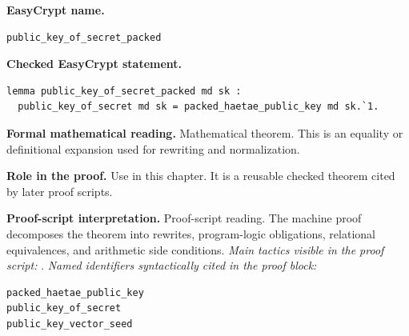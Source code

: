 \begin{formaltheorem}
\noindent\textbf{EasyCrypt name.}
\begin{lstlisting}[language=EasyCrypt,basicstyle=\ttfamily\scriptsize]
public_key_of_secret_packed
\end{lstlisting}
\noindent\textbf{Checked EasyCrypt statement.}
\begin{lstlisting}[language=EasyCrypt,basicstyle=\ttfamily\scriptsize]
lemma public_key_of_secret_packed md sk :
  public_key_of_secret md sk = packed_haetae_public_key md sk.`1.
\end{lstlisting}
\noindent\textbf{Formal mathematical reading.}
Mathematical theorem. This is an equality or definitional expansion used for rewriting and normalization.

\noindent\textbf{Role in the proof.}
Use in this chapter. It is a reusable checked theorem cited by later proof scripts.

\noindent\textbf{Proof-script interpretation.}
Proof-script reading. The machine proof decomposes the theorem into rewrites, program-logic obligations, relational equivalences, and arithmetic side conditions.
\emph{Main tactics visible in the proof script:} .
\emph{Named identifiers syntactically cited in the proof block:}
\begin{lstlisting}[language=EasyCrypt,basicstyle=\ttfamily\scriptsize]
packed_haetae_public_key
public_key_of_secret
public_key_vector_seed
\end{lstlisting}

\end{formaltheorem}

